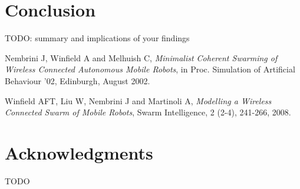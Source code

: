 \documentclass[a4paper, 10pt, conference]{ieeeconf}
\begin{document}
\section{Conclusion}
  TODO: summary and implications of your findings




\begin{thebibliography}{99}

   Nembrini J, Winfield A and Melhuish C, \textit{Minimalist Coherent Swarming of Wireless Connected Autonomous Mobile Robots}, in Proc. Simulation of Artificial Behaviour '02, Edinburgh, August 2002.

   Winfield AFT, Liu W, Nembrini J and Martinoli A, \textit{Modelling a Wireless Connected Swarm of Mobile Robots}, Swarm Intelligence, 2 (2-4), 241-266, 2008.

\end{thebibliography}

\section*{Acknowledgments}
  TODO
\end{document}
